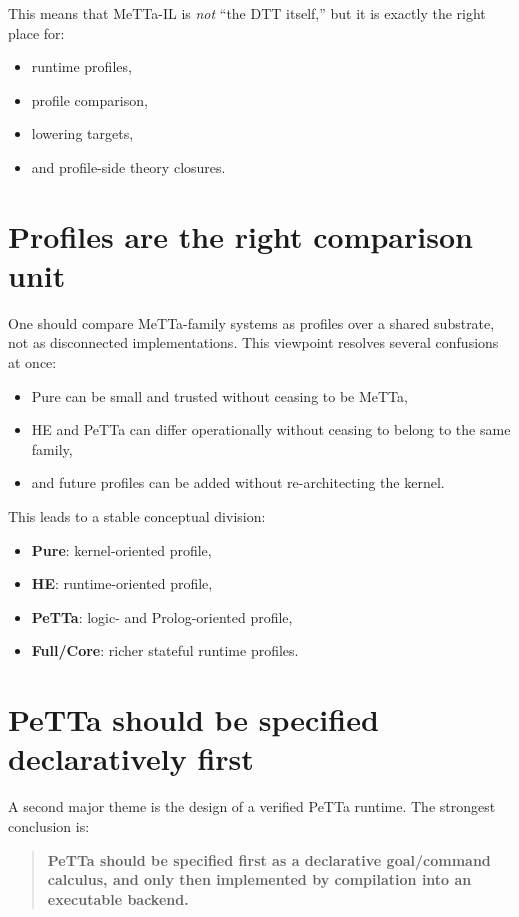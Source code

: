 \documentclass[11pt]{article}
\begin{document}
This means that MeTTa-IL is \emph{not} ``the DTT itself,'' but it is exactly the right place for:
\begin{itemize}
  \item runtime profiles,
  \item profile comparison,
  \item lowering targets,
  \item and profile-side theory closures.
\end{itemize}

\section{Profiles are the right comparison unit}

One should compare MeTTa-family systems as profiles over a shared substrate, not as disconnected implementations. This viewpoint resolves several confusions at once:
\begin{itemize}
  \item Pure can be small and trusted without ceasing to be MeTTa,
  \item HE and PeTTa can differ operationally without ceasing to belong to the same family,
  \item and future profiles can be added without re-architecting the kernel.
\end{itemize}

This leads to a stable conceptual division:
\begin{itemize}
  \item \textbf{Pure}: kernel-oriented profile,
  \item \textbf{HE}: runtime-oriented profile,
  \item \textbf{PeTTa}: logic- and Prolog-oriented profile,
  \item \textbf{Full/Core}: richer stateful runtime profiles.
\end{itemize}

\section{PeTTa should be specified declaratively first}

A second major theme is the design of a verified PeTTa runtime. The strongest conclusion is:

\begin{quote}
\textbf{PeTTa should be specified first as a declarative goal/command calculus, and only then implemented by compilation into an executable backend.}
\end{quote}
\end{document}
